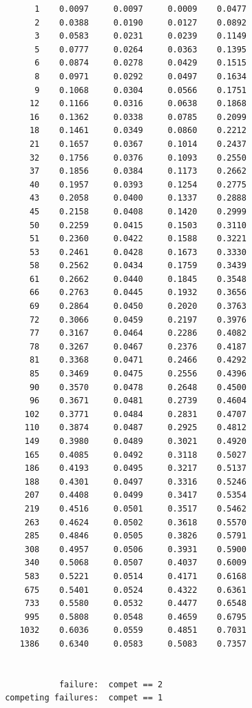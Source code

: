 \documentclass[
  12pt,
  letterpaper,
  DIV=11,
  numbers=noendperiod,
  onepage,
  openany]{scrreprt}
\begin{document}
\begin{verbatim}
       1    0.0097     0.0097     0.0009    0.0477
       2    0.0388     0.0190     0.0127    0.0892
       3    0.0583     0.0231     0.0239    0.1149
       5    0.0777     0.0264     0.0363    0.1395
       6    0.0874     0.0278     0.0429    0.1515
       8    0.0971     0.0292     0.0497    0.1634
       9    0.1068     0.0304     0.0566    0.1751
      12    0.1166     0.0316     0.0638    0.1868
      16    0.1362     0.0338     0.0785    0.2099
      18    0.1461     0.0349     0.0860    0.2212
      21    0.1657     0.0367     0.1014    0.2437
      32    0.1756     0.0376     0.1093    0.2550
      37    0.1856     0.0384     0.1173    0.2662
      40    0.1957     0.0393     0.1254    0.2775
      43    0.2058     0.0400     0.1337    0.2888
      45    0.2158     0.0408     0.1420    0.2999
      50    0.2259     0.0415     0.1503    0.3110
      51    0.2360     0.0422     0.1588    0.3221
      53    0.2461     0.0428     0.1673    0.3330
      58    0.2562     0.0434     0.1759    0.3439
      61    0.2662     0.0440     0.1845    0.3548
      66    0.2763     0.0445     0.1932    0.3656
      69    0.2864     0.0450     0.2020    0.3763
      72    0.3066     0.0459     0.2197    0.3976
      77    0.3167     0.0464     0.2286    0.4082
      78    0.3267     0.0467     0.2376    0.4187
      81    0.3368     0.0471     0.2466    0.4292
      85    0.3469     0.0475     0.2556    0.4396
      90    0.3570     0.0478     0.2648    0.4500
      96    0.3671     0.0481     0.2739    0.4604
     102    0.3771     0.0484     0.2831    0.4707
     110    0.3874     0.0487     0.2925    0.4812
     149    0.3980     0.0489     0.3021    0.4920
     165    0.4085     0.0492     0.3118    0.5027
     186    0.4193     0.0495     0.3217    0.5137
     188    0.4301     0.0497     0.3316    0.5246
     207    0.4408     0.0499     0.3417    0.5354
     219    0.4516     0.0501     0.3517    0.5462
     263    0.4624     0.0502     0.3618    0.5570
     285    0.4846     0.0505     0.3826    0.5791
     308    0.4957     0.0506     0.3931    0.5900
     340    0.5068     0.0507     0.4037    0.6009
     583    0.5221     0.0514     0.4171    0.6168
     675    0.5401     0.0524     0.4322    0.6361
     733    0.5580     0.0532     0.4477    0.6548
     995    0.5808     0.0548     0.4659    0.6795
    1032    0.6036     0.0559     0.4851    0.7031
    1386    0.6340     0.0583     0.5083    0.7357


            failure:  compet == 2
 competing failures:  compet == 1


\end{verbatim}
\end{document}
